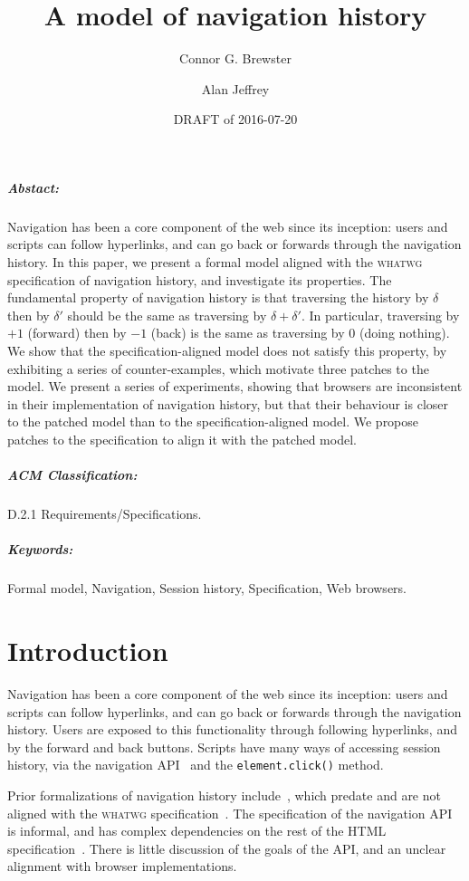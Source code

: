 \documentclass{notes}
\title{A model of navigation history}
\author{Connor G. Brewster \and Alan Jeffrey}
\date{DRAFT of 2016-07-20}
\begin{document}
\maketitle

\subparagraph{Abstact:}
Navigation has been a core component of the web since its inception:
users and scripts can follow hyperlinks, and can go back or forwards
through the navigation history. In this paper, we present a formal
model aligned with the \textsc{whatwg} specification of navigation
history, and investigate its properties. The fundamental property of
navigation history is that traversing the history by $\delta$ then by
$\delta'$ should be the same as traversing by $\delta+\delta'$. In
particular, traversing by $+1$ (forward) then by $-1$ (back) is the
same as traversing by $0$ (doing nothing). We show that the
specification-aligned model does not satisfy this property, by
exhibiting a series of counter-examples, which motivate three patches
to the model. We present a series of experiments, showing that
browsers are inconsistent in their implementation of navigation
history, but that their behaviour is closer to the patched model than
to the specification-aligned model. We propose patches to the
specification to align it with the patched model.

\subparagraph{ACM Classification:}
D.2.1 Requirements/Specifications.

\subparagraph{Keywords:}
Formal model,
Navigation,
Session history,
Specification,
Web browsers.

\section{Introduction}

Navigation has been a core component of the web since its inception:
users and scripts can follow hyperlinks, and can go back or forwards
through the navigation history. Users are exposed to this functionality
through following hyperlinks, and by the forward and back buttons.
Scripts have many ways of accessing session history, via the
navigation API~\cite[\S7.7]{whatwg} and the \verb|element.click()| method.

Prior formalizations of navigation history
include~\cite{HH:2006,Haydar:2004,HPS:2004,LHYT:2000,WP:2003}, which
predate and are not aligned with the \textsc{whatwg}
specification~\cite{whatwg}.  The specification of the navigation API
is informal, and has complex dependencies on the rest of the HTML
specification~\cite{whatwg}. There is little discussion of the goals
of the API, and an unclear alignment with browser implementations.
\end{document}
